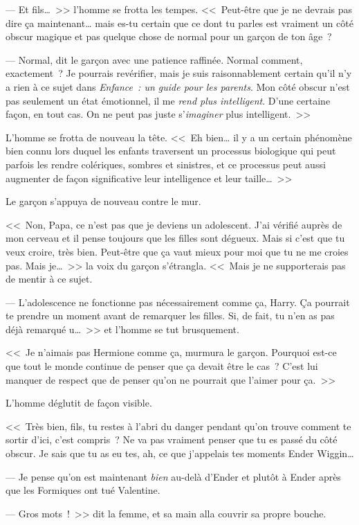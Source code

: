 --- Et fils…~>> l'homme se frotta les tempes. <<~Peut-être que je ne devrais pas dire ça maintenant… mais es-tu certain que ce dont tu parles est vraiment un côté obscur magique et pas quelque chose de normal pour un garçon de ton âge~?

--- Normal, dit le garçon avec une patience raffinée. Normal comment, exactement~? Je pourrais revérifier, mais je suis raisonnablement certain qu'il n'y a rien à ce sujet dans \emph{Enfance~: un guide pour les parents}. Mon côté obscur n'est pas seulement un état émotionnel, il me \emph{rend plus intelligent}. D'une certaine façon, en tout cas. On ne peut pas juste s'\emph{imaginer} plus intelligent.~>>

L'homme se frotta de nouveau la tête. <<~Eh bien… il y a un certain phénomène bien connu lors duquel les enfants traversent un processus biologique qui peut parfois les rendre colériques, sombres et sinistres, et ce processus peut aussi augmenter de façon significative leur intelligence et leur taille…~>>

Le garçon s'appuya de nouveau contre le mur.

<<~Non, Papa, ce n'est pas que je deviens un adolescent. J'ai vérifié auprès de mon cerveau et il pense toujours que les filles sont dégueux. Mais si c'est que tu veux croire, très bien. Peut-être que ça vaut mieux pour moi que tu ne me croies pas. Mais je…~>> la voix du garçon s'étrangla. <<~Mais je ne supporterais pas de mentir à ce sujet.

--- L'adolescence ne fonctionne pas nécessairement comme ça, Harry. Ça pourrait te prendre un moment avant de remarquer les filles. Si, de fait, tu n'en as pas déjà remarqué u…~>> et l'homme se tut brusquement.

<<~Je n'aimais pas Hermione comme ça, murmura le garçon. Pourquoi est-ce que tout le monde continue de penser que ça devait être le cas~? C'est lui manquer de respect que de penser qu'on ne pourrait que l'aimer pour ça.~>>

L'homme déglutit de façon visible.

<<~Très bien, fils, tu restes à l'abri du danger pendant qu'on trouve comment te sortir d'ici, c'est compris~? Ne va pas vraiment penser que tu es passé du côté obscur. Je sais que tu as eu tes, ah, ce que j'appelais tes moments Ender Wiggin…

--- Je pense qu'on est maintenant \emph{bien} au-delà d'Ender et plutôt à Ender après que les Formiques ont tué Valentine.

--- Gros mots~!~>> dit la femme, et sa main alla couvrir sa propre bouche.


